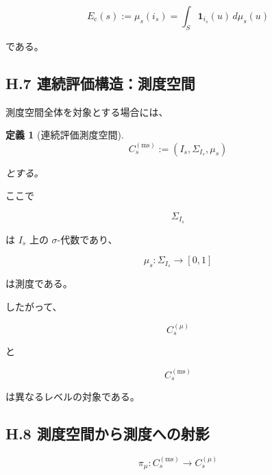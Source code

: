 \documentclass[a4paper,11pt]{article}
\newtheorem{definition}{定義}[section]
\begin{document}
\begin{equation}
    E_{\mathrm c}(s)
    :=
    \mu_s(i_s)
    =
    \int_S
    \mathbf1_{i_s}(u)
    \,d\mu_s(u)
\end{equation}

である。


\subsection{H.7 連続評価構造：測度空間}

測度空間全体を対象とする場合には、

\begin{definition}[連続評価測度空間]
\begin{equation}
    \boxed{
        C_s^{(\mathrm{ms})}
        :=
        (I_s,\Sigma_{I_s},\mu_s)
    }
\end{equation}

とする。
\end{definition}

ここで

\begin{equation}
    \Sigma_{I_s}
\end{equation}

は $I_s$ 上の $\sigma$-代数であり、

\begin{equation}
    \mu_s:
    \Sigma_{I_s}\to[0,1]
\end{equation}

は測度である。

したがって、

\begin{equation}
    C_s^{(\mu)}
\end{equation}

と

\begin{equation}
    C_s^{(\mathrm{ms})}
\end{equation}

は異なるレベルの対象である。


\subsection{H.8 測度空間から測度への射影}

\begin{equation}
    \pi_\mu:
    C_s^{(\mathrm{ms})}
    \to
    C_s^{(\mu)}
\end{equation}
\end{document}
